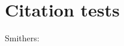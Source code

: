 \documentclass[Thesis.tex]{subfiles}
\begin{document}
\chapter{Citation tests}

Smithers: \cite{Smithers:1994}
\end{document}
